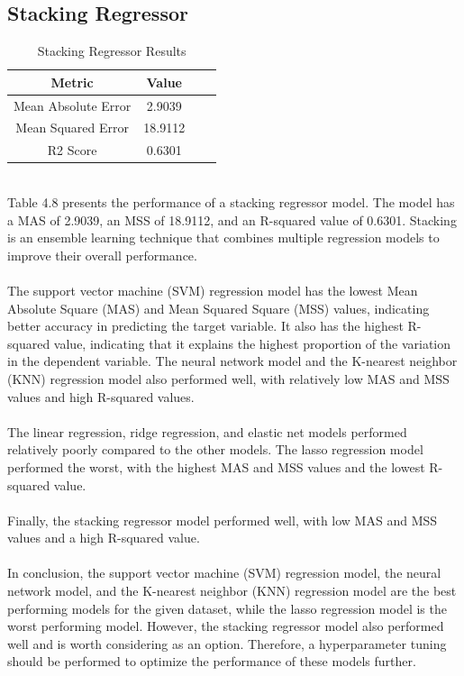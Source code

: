 \documentclass{report}
\begin{document}
\subsection{Stacking Regressor}
\begin{table}[h]
\centering
\begin{tabular}{|c|c|c|c|}
\hline
\textbf{Metric} & \textbf{Value} \\ \hline
Mean Absolute Error & 2.9039 \\ \hline
Mean Squared Error & 18.9112 \\ \hline
R2 Score &  0.6301 \\ \hline
\end{tabular}
\caption{Stacking Regressor Results}
\end{table}
\hfill \break
\\
Table 4.8 presents the performance of a stacking regressor model. The model has a MAS of 2.9039, an MSS of 18.9112, and an R-squared value of 0.6301. Stacking is an ensemble learning technique that combines multiple regression models to improve their overall performance.\\
\\
The support vector machine (SVM) regression model has the lowest Mean Absolute Square (MAS) and Mean Squared Square (MSS) values, indicating better accuracy in predicting the target variable. It also has the highest R-squared value, indicating that it explains the highest proportion of the variation in the dependent variable. The neural network model and the K-nearest neighbor (KNN) regression model also performed well, with relatively low MAS and MSS values and high R-squared values.\\
\\
The linear regression, ridge regression, and elastic net models performed relatively poorly compared to the other models. The lasso regression model performed the worst, with the highest MAS and MSS values and the lowest R-squared value.\\
\\
Finally, the stacking regressor model performed well, with low MAS and MSS values and a high R-squared value.\\
\\
In conclusion, the support vector machine (SVM) regression model, the neural network model, and the K-nearest neighbor (KNN) regression model are the best performing models for the given dataset, while the lasso regression model is the worst performing model. However, the stacking regressor model also performed well and is worth considering as an option. Therefore, a hyperparameter tuning should be performed to optimize the performance of these models further. 
\end{document}
